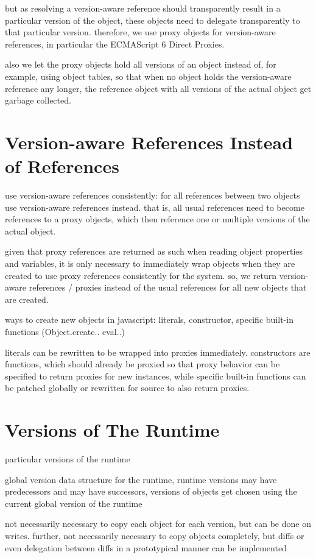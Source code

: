 but as resolving a version-aware reference should transparently result in a particular version of the object, these objects need to delegate transparently to that particular version.
therefore, we use proxy objects for version-aware references, in particular the ECMAScript 6 Direct Proxies.

also we let the proxy objects hold all versions of an object instead of, for example, using object tables, so that when no object holds the version-aware reference any longer, the reference object with all versions of the actual object get garbage collected.



\section{Version-aware References Instead of References}

use version-aware references consistently:
for all references between two objects use version-aware references instead. that is, all usual references need to become references to a proxy objects, which then reference one or multiple versions of the actual object.

given that proxy references are returned as such when reading object properties and variables, it is only necessary to immediately wrap objects when they are created to use proxy references consistently for the system. so, we return version-aware references / proxies instead of the usual references for all new objects that are created.

ways to create new objects in javascript: literals, constructor, specific built-in functions (Object.create.. eval..)

literals can be rewritten to be wrapped into proxies immediately. constructors are functions, which should already be proxied so that proxy behavior can be specified to return proxies for new instances, while specific built-in functions can be patched globally or rewritten for source to also return proxies.



\section{Versions of The Runtime}

particular versions of the runtime

global version data structure for the runtime, runtime versions may have predecessors and may have successors, versions of objects get chosen using the current global version of the runtime

not necessarily necessary to copy each object for each version, but can be done on writes. further, not necessarily necessary to copy objects completely, but diffs or even delegation between diffs in a prototypical manner can be implemented
